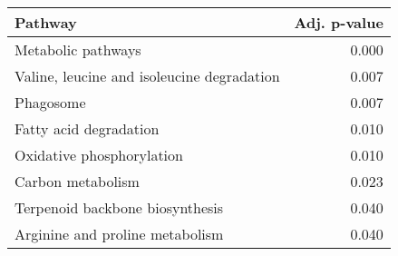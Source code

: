 \begin{tabular}{lr}
\toprule
                                    Pathway &  Adj. p-value \\
\midrule
                         Metabolic pathways &         0.000 \\
 Valine, leucine and isoleucine degradation &         0.007 \\
                                  Phagosome &         0.007 \\
                     Fatty acid degradation &         0.010 \\
                  Oxidative phosphorylation &         0.010 \\
                          Carbon metabolism &         0.023 \\
            Terpenoid backbone biosynthesis &         0.040 \\
            Arginine and proline metabolism &         0.040 \\
\bottomrule
\end{tabular}
